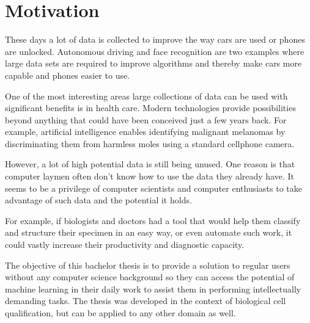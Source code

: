 \chapter{Motivation}

These days a lot of data is collected to improve the way cars are used or phones are unlocked. Autonomous driving and face recognition are two examples where large data sets are required to improve algorithms and thereby make cars more capable and phones easier to use. 

One of the most interesting areas large collections of data can be
used with significant benefits is in health care. Modern
technologies provide
possibilities beyond anything that could have been 
conceived just a few years back. 
For example, artificial
intelligence enables identifying malignant melanomas by
discriminating them from harmless moles using a standard cellphone camera.

However, a lot of high potential data is still being unused. 
One reason is that computer laymen often don't know how to use the data they already have. 
It seems to be a privilege of computer scientists and computer enthusiasts to take advantage of such data and the potential it holds. 

For example, if biologists and doctors had a tool that would 
help them classify and structure their specimen
in an easy way, or even automate such work, it could vastly
increase their productivity and diagnostic capacity.

The objective of this bachelor thesis is to provide a solution to regular
users without any computer science background so they can access the
potential of machine learning in their daily work to assist them
in performing intellectually demanding tasks. The thesis was developed in
the context of biological cell qualification, but can be applied to any
other domain as well.

